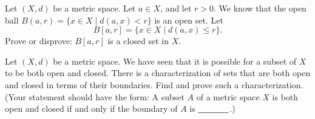 \begin{comment}
Finally, suppose $x > 0$. If $x > 1$, then $B(x,x-1)$ contains only real numbers larger than $1$. So a positive real number larger than $1$ is not a boundary, accumulation, isolated, or interior point of $A$. The last case to consider is to suppose that $0 < x < 1$. There is an integer $N$ such that $N < \frac{1}{x} < N+1$. So $\frac{1}{N+1} < x < \frac{1}{N}$. Letting $r = \min\left\{\frac{1}{N} - x, x - \frac{1}{N+1}\right\}$ we have that $B(x,r) \subset  \left(\frac{1}{N+1}, \frac{1}{N}\right)$ and so $B(x,r)$ contains no points of $A$. 

We conclude that the set of boundary points of $A$ is $A \cup \{0\}$, the set of accumulation points of $A$ is $A \cup \{0\}$, there are no interior points of $A$, and the set of isolated points of $A$ is $A$. 

Since $\Int(A) = \emptyset$, we conclude that $A$ is not an open set. Also, $0$ is not an interior point of $\R \setminus A$, so $\R \setminus A$ is not open, meaning that $A$ is not closed.   


\ea

\end{comment}


\item Let $(X,d)$ be a metric space. Let $a \in X$, and let $r > 0$. We know that the open ball $B(a,r) = \{x \in X \mid d(a,x) < r\}$ is an open set. Let 
\[B[a,r] = \{x \in X \mid d(a,x) \leq r\}.\]
Prove or disprove: $B[a,r]$ is a closed set in $X$.

\begin{comment}

\ExerciseSolution Let $(X,d)$ be a metric space. Let $a \in X$, and let $r > 0$. We will show that $B[a,r]$ is a closed set by showing that $X \setminus B[a,r]$ is an open set. Let $b \in X \setminus B[a,r]$. Then $d(a,b) > r$. Let $s = d(a,b)-r$, and let $B = B(b,s)$. Let $x \in B$. Then
\[d(a,b) \leq d(a,x) + d(x,b).\]
Since $d(x,b) < s$, we have 
\[d(a,x) \geq d(a,b) - d(x,b) > d(a,b) - s = d(a,b) - (d(a,b) - r) = r.\]
So $x \notin B[a,r]$ and $B \subseteq X \setminus B[a,r]$. This makes $X \setminus B[a,r]$ a neighborhood of each of its points and so $X \setminus B[a,r]$ is open. We conclude that $B[a,r]$ is a closed set.  

\end{comment}

\item Let $(X,d)$ be a metric space. We have seen that it is possible for a subset of $X$ to be both open and closed. There is a characterization of sets that are both open and closed in terms of their boundaries. Find and prove such a characterization. (Your statement should have the form: A subset $A$ of a metric space $X$ is both open and closed if and only if the boundary of $A$ is $\underline{\hspace{0.5in}}$.)

